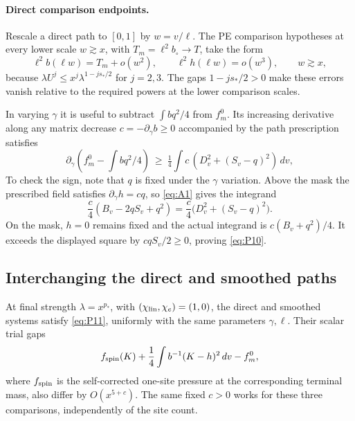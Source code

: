 \paragraph{Direct comparison endpoints.}
Rescale a direct path to \([0,1]\) by \(w=v/\ell\). The PE comparison
hypotheses at every lower scale \(w\gtrsim x\), with
\(T_m=\ell^2b_\circ\to T\), take the form
\[
 \ell^2 b(\ell w)=T_m+o(w^2),\qquad \ell^2 h(\ell w)=o(w^3),\qquad w\gtrsim x,
                                                                        \tag{P9}\label{eq:P9}
\]
because \(\lambda U^j\le x^j\lambda^{1-js_*/2}\) for \(j=2,3\).
The gaps \(1-js_*/2>0\) make these errors vanish relative to the
required powers at the lower comparison scales.

In varying \(\gamma\) it is useful to subtract \(\int b q^2/4\) from \(f_m^0\). Its increasing derivative along any matrix decrease \(c=-\partial_\gamma b\ge0\) accompanied by the path prescription satisfies
\[
 \partial_\gamma(f_m^0-\int bq^2/4)
 \ \ge\ \tfrac14\int c\,(D_v^2+(S_v-q)^2)\,dv,                         \tag{P10}\label{eq:P10}
\]
To check the sign, note that \(q\) is fixed under the \(\gamma\)
variation. Above the mask the prescribed field satisfies
\(\partial_\gamma h=cq\), so \eqref{eq:A1} gives the integrand
\[
 \frac c4(B_v-2qS_v+q^2)
 =\frac c4\big(D_v^2+(S_v-q)^2\big).
\]
On the mask, \(h=0\) remains fixed and the actual integrand is
\(c(B_v+q^2)/4\). It exceeds the displayed square by
\(cqS_v/2\ge0\), proving \eqref{eq:P10}.

\subsection{Interchanging the direct and smoothed paths}

\begin{proposition}
\label{paths:switch}
At final strength \(\lambda=x^{p_*}\), with
\((\chi_{\rm lin},\chi_e)=(1,0)\), the direct and smoothed systems
satisfy \eqref{eq:P11}, uniformly with the same parameters
\(\gamma,\ell\). Their scalar trial gaps
\[
 f_{\rm spin}(K)+\frac14\int b^{-1}(K-h)^2\,dv-f_m^0,
\]
where \(f_{\rm spin}\) is the self-corrected one-site pressure at
the corresponding terminal mass, also differ by \(O(x^{5+c})\).
The same fixed \(c>0\) works for these three comparisons, independently
of the site count.
\end{proposition}

